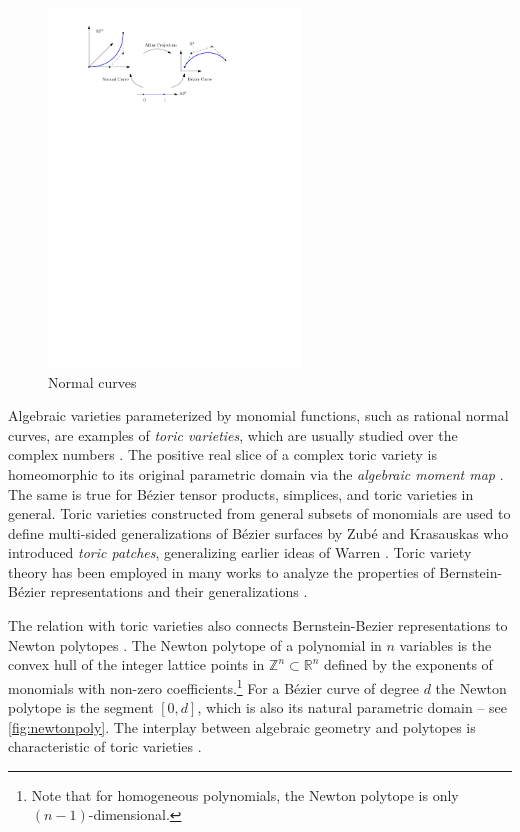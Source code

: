 \documentclass[final,3p,mathptmx]{elsarticle}
\begin{document}
\begin{figure}[h]
	\centering
	\includegraphics[width=0.6\textwidth, keepaspectratio]{figures/normalcurve.pdf}
	\caption{Normal curves}
	\label{fig:normalcurve}
\end{figure}

Algebraic varieties parameterized by monomial functions, such as rational normal curves, are examples of \emph{toric varieties}, which are usually studied over the complex numbers \cite{danilov1978geometry,cox2003what,cox2011toric}. The positive real slice of a complex toric variety is homeomorphic to its original parametric domain via the \emph{algebraic moment map} \cite{sottile2003toric}. The same is true for B\'{e}zier tensor products, simplices, and toric varieties in general. Toric varieties constructed from general subsets of monomials are used to define multi-sided generalizations of B\'{e}zier surfaces by Zub\'{e} and Krasauskas \cite{zub2000n,krasauskas2001shape,krasauskas2002toric} who introduced \emph{toric patches}, generalizing earlier ideas of Warren \cite{warren1992creating,warren1994multi,warren1994bound}. Toric variety theory has been employed in many works to analyze the properties of Bernstein-B\'{e}zier representations and their generalizations \cite{karciauskas1999comparison,cox2003universal,krasauskas2005universal,krasauskas2006bezier,craciun2010some,garcia2010linear,sottile2011injectivity,garc2011toric,sun2015g1}.

The relation with toric varieties also connects Bernstein-Bezier representations to Newton polytopes \cite{khovanskii1992newton,atiyah1983angular}. The Newton polytope of a polynomial in $n$ variables is the convex hull of the integer lattice points in $\mathbb{Z}^{n} \subset \mathbb{R}^{n}$ defined by the exponents of monomials with non-zero coefficients.\footnote{Note that for homogeneous polynomials, the Newton polytope is only $(n-1)$-dimensional.} For a B\'{e}zier curve of degree $d$ the Newton polytope is the segment $[0,d]$, which is also its natural parametric domain  -- see \autoref{fig:newtonpoly}.  The interplay between algebraic geometry and polytopes is characteristic of toric varieties \cite{ewald1996combinatorial}.
\end{document}
